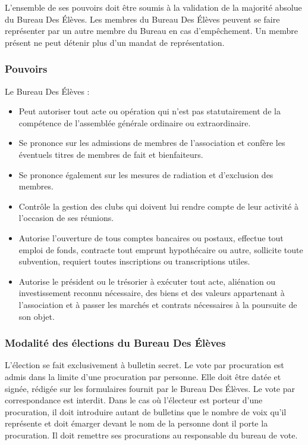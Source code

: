 \documentclass{article} %
\begin{document}
				L’ensemble de ses pouvoirs doit être soumis à la validation de la majorité absolue du Bureau Des Élèves. Les membres du Bureau Des Élèves
				peuvent se faire représenter par un autre membre du Bureau en cas d’empêchement. Un membre présent ne peut détenir plus d’un mandat de représentation.

			\subsubsection{Pouvoirs}
				Le Bureau Des Élèves :
				\begin{itemize}
					\item Peut autoriser tout acte ou opération qui n’est pas statutairement de la compétence de l’assemblée générale ordinaire ou extraordinaire.
					\item Se prononce sur les admissions de membres de l’association et confère les éventuels titres de membres de fait et bienfaiteurs.
					\item Se prononce également sur les mesures de radiation et d’exclusion des membres.
					\item Contrôle la gestion des clubs qui doivent lui rendre compte de leur activité à l’occasion de ses réunions.
					\item Autorise l’ouverture de tous comptes bancaires ou postaux, effectue tout emploi de fonds, contracte tout emprunt hypothécaire ou autre,
						sollicite toute subvention, requiert toutes inscriptions ou transcriptions utiles.
					\item Autorise le président ou le trésorier à exécuter tout acte, aliénation ou investissement reconnu nécessaire,
						des biens et des valeurs appartenant à l’association et à passer les marchés et contrats nécessaires à la poursuite de son objet.
				\end{itemize}

			\subsubsection{Modalité des élections du Bureau Des Élèves}
				L’élection se fait exclusivement à bulletin secret. Le vote par procuration est admis dans la limite d’une procuration par personne.
				Elle doit être datée et signée, rédigée sur les formulaires fournit par le Bureau Des Élèves. Le vote par correspondance est interdit.
				Dans le cas où l’électeur est porteur d’une procuration, il doit introduire autant de bulletins que le nombre de voix qu’il représente
				et doit émarger devant le nom de la personne dont il porte la procuration. Il doit remettre ses procurations au responsable du bureau de vote.
				
\end{document}
